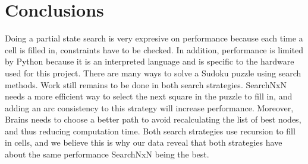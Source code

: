 \documentclass[letterpaper]{article}
\begin{document}
\section{Conclusions}
Doing a partial state search is very expresive on performance because each time a cell is filled in, constraints have to be checked. In addition, performance is limited by Python because it is an interpreted language and is specific to the hardware used for this project. There are many ways to solve a Sudoku puzzle using search methods. Work still remains to be done in both search strategies. SearchNxN needs a more efficient way to select the next square in the puzzle to fill in, and adding an arc consistency to this strategy will increase performance. Moreover, Brains needs to choose a better path to avoid recalculating the list of best nodes, and thus reducing computation time. Both search strategies use recursion to fill in cells, and we believe this is why our data reveal that both strategies have about the same performance SearchNxN being the best.
\end{document}

